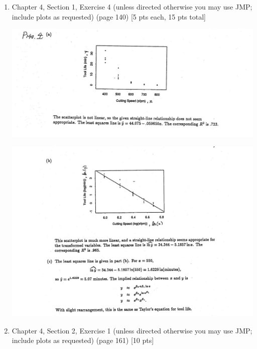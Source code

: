 \documentclass[11pt]{article}\usepackage[]{graphicx}\usepackage[]{color}
\begin{document}
\begin{enumerate}
\begin{center}
\begin{minipage}{\linewidth}
	\end{minipage}
\end{center}
	\pagebreak
	\item Chapter 4, Section 1, Exercise 4  (unless directed otherwise you may use JMP; include plots as requested) (page 140) [5 pts each, 15 pts total]	
		\begin{center}
	\begin{minipage}{\linewidth}
		\centering
		\includegraphics[width=\textwidth]{02.JPG}
	\end{minipage}
		\begin{center}
	\begin{minipage}{\linewidth}
		\centering
		\includegraphics[width=\textwidth]{03.JPG}
	\end{minipage}
\end{center}
\end{center}
\pagebreak
	\item Chapter 4, Section 2, Exercise 1  (unless directed otherwise you may use JMP; include plots as requested) (page 161) [10 pts]
	

\end{enumerate}
\end{document}
